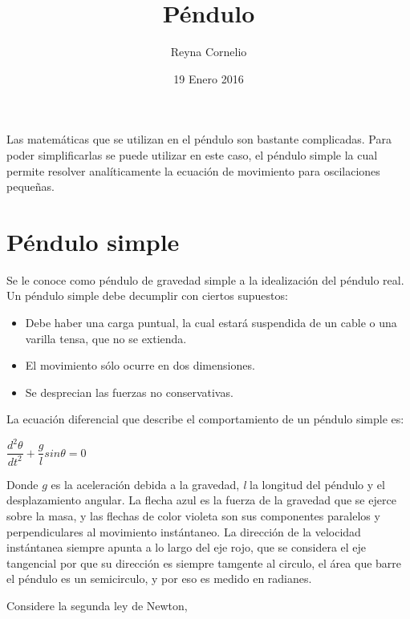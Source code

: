 \documentclass[12pt]{article}
\begin{document}
\title{Péndulo}
\author{Reyna Cornelio}
\date{19 Enero 2016}
\maketitle
Las matemáticas que se utilizan en el péndulo son bastante complicadas. Para poder simplificarlas se puede utilizar en este caso, el péndulo simple la cual permite resolver analíticamente la ecuación de movimiento para oscilaciones pequeñas. 

\section{Péndulo simple}
Se le conoce como péndulo de gravedad simple a la idealización del péndulo real. 
Un péndulo simple debe decumplir con ciertos supuestos:

\begin{itemize}
\item 
Debe haber una carga puntual, la cual estará suspendida de un cable o una varilla tensa, que no se extienda.
\end{itemize}

\begin{itemize}
\item 

El movimiento sólo ocurre en dos dimensiones.
\end{itemize}

\begin{itemize}
\item 
Se desprecian las fuerzas no conservativas.
\end{itemize}


La ecuación diferencial que describe el comportamiento de un péndulo simple es:

$ \dfrac{d^2\theta}{dt^2}+\dfrac{g}{l}sin\theta=0 $

Donde $\textit{g}$ es la aceleración debida a la gravedad, \textit{l} la longitud del péndulo y \textit{\theta} el desplazamiento angular. La flecha azul es la fuerza de la gravedad que se ejerce sobre la masa, y las flechas de color violeta son sus componentes paralelos y perpendiculares al movimiento instántaneo. La dirección de la velocidad instántanea siempre apunta a lo largo del eje rojo, que se considera el eje tangencial por que su dirección es siempre tamgente al circulo, el área que barre el péndulo es un semicirculo, y por eso \theta es medido en radianes.

Considere la segunda ley de Newton,
\end{document}
